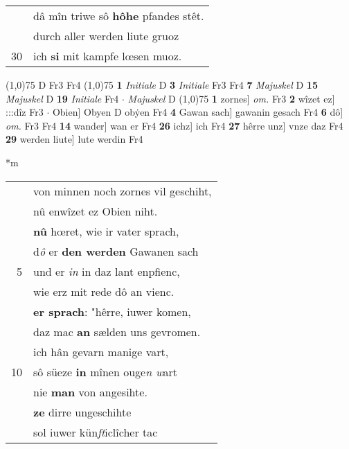 \documentclass[8pt,a4paper,notitlepage]{article}
\begin{document}
\begin{table}[ht]
\begin{minipage}[t]{0.5\linewidth}
\begin{tabular}{rl}
 & dâ mîn triwe sô \textbf{hôhe} pfandes stêt.\\ 
 & durch aller werden liute gruoz\\ 
30 & ich \textbf{si} mit kampfe lœsen muoz.\\ 
\end{tabular}
\scriptsize
\line(1,0){75} \newline
D Fr3 Fr4 \newline
\line(1,0){75} \newline
\textbf{1} \textit{Initiale} D  \textbf{3} \textit{Initiale} Fr3 Fr4  \textbf{7} \textit{Majuskel} D  \textbf{15} \textit{Majuskel} D  \textbf{19} \textit{Initiale} Fr4   $\cdot$ \textit{Majuskel} D  \newline
\line(1,0){75} \newline
\textbf{1} zornes] \textit{om.} Fr3 \textbf{2} wîzet ez] :::dîz Fr3  $\cdot$ Obien] Obyen D obẏen Fr4 \textbf{4} Gawan sach] gawanin gesach Fr4 \textbf{6} dô] \textit{om.} Fr3 Fr4 \textbf{14} wander] wan er Fr4 \textbf{26} ichz] ich Fr4 \textbf{27} hêrre unz] vnze daz Fr4 \textbf{29} werden liute] lute werdin Fr4 \newline
\end{minipage}
\hspace{0.5cm}
\begin{minipage}[t]{0.5\linewidth}
\small
\begin{center}*m
\end{center}
\begin{tabular}{rl}
 & von minnen noch zornes vil geschiht,\\ 
 & nû enwîzet ez Obien niht.\\ 
 & \textbf{nû} hœret, wie ir vater sprach,\\ 
 & d\textit{ô} er \textbf{den werden} Gawanen sach\\ 
5 & und er \textit{in} in daz lant enpfienc,\\ 
 & wie erz mit rede dô an vienc.\\ 
 & \textbf{er sprach}: "hêrre, iuwer komen,\\ 
 & daz mac \textbf{an} sælden uns gevromen.\\ 
 & ich hân gevarn manige vart,\\ 
10 & sô süeze \textbf{in} mînen ouge\textit{n w}art\\ 
 & nie \textbf{man} von angesihte.\\ 
 & \textbf{ze} dirre ungeschihte\\ 
 & sol iuwer kün\textit{ft}iclîcher tac\\ 

\end{tabular}
\end{minipage}
\end{table}
\end{document}
